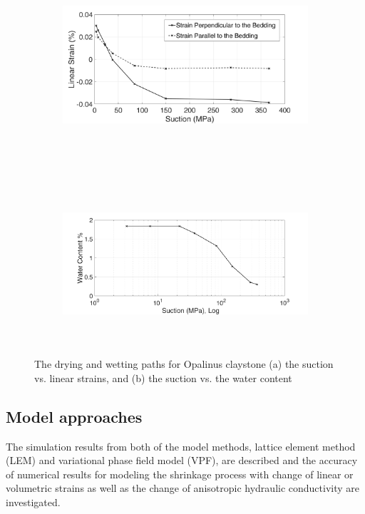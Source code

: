 \begin{figure}[!ht]
\begin{subfigure}[b]{1\textwidth}
\centering
\includegraphics[width=11cm,height=6cm]{figures/Amir_ME6_Strain.png}
\subcaption{}
\label{fig:Amir_ME6_Strain}
\end{subfigure}
\\
\begin{subfigure}[b]{1\textwidth}
\centering
\includegraphics[width=11cm,height=6cm]{figures/Amir_ME6_Water.png}
\subcaption{}
\label{fig:Amir_ME6_Water}
\end{subfigure}
\caption{The drying and wetting paths for Opalinus claystone (a) the suction vs. linear strains, and (b) the suction vs. the water content}
\end{figure}

\subsection{Model approaches}
The simulation results from both of the model methods, lattice element method (LEM) and variational phase field model (VPF), are described and the accuracy of numerical results for modeling the shrinkage process with change of linear or volumetric strains as well as the change of anisotropic hydraulic conductivity are investigated. 
